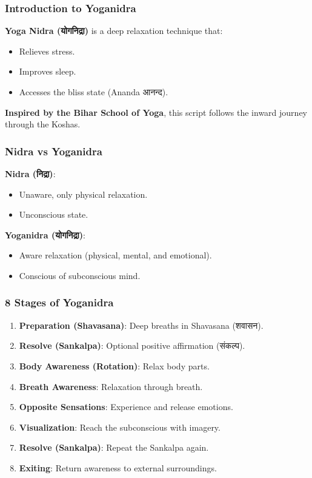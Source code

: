 \begin{frame}[fragile]\frametitle{Introduction to Yoganidra}
    \textbf{Yoga Nidra (योगनिद्रा)} is a deep relaxation technique that:
    \begin{itemize}
        \item Relieves stress.
        \item Improves sleep.
        \item Accesses the bliss state (Ananda आनन्द).
    \end{itemize}
    \textbf{Inspired by the Bihar School of Yoga}, this script follows the inward journey through the Koshas.
\end{frame}

\begin{frame}[fragile]\frametitle{Nidra vs Yoganidra}
    \textbf{Nidra (निद्रा)}: \\
    \begin{itemize}
        \item Unaware, only physical relaxation.
        \item Unconscious state.
    \end{itemize}
    \vspace{5mm}
    \textbf{Yoganidra (योगनिद्रा)}: \\
    \begin{itemize}
        \item Aware relaxation (physical, mental, and emotional).
        \item Conscious of subconscious mind.
    \end{itemize}
\end{frame}

\begin{frame}[fragile]\frametitle{8 Stages of Yoganidra}
    \begin{enumerate}
        \item \textbf{Preparation (Shavasana)}: Deep breaths in Shavasana (शवासन).
        \item \textbf{Resolve (Sankalpa)}: Optional positive affirmation (संकल्प).
        \item \textbf{Body Awareness (Rotation)}: Relax body parts.
        \item \textbf{Breath Awareness}: Relaxation through breath.
        \item \textbf{Opposite Sensations}: Experience and release emotions.
        \item \textbf{Visualization}: Reach the subconscious with imagery.
        \item \textbf{Resolve (Sankalpa)}: Repeat the Sankalpa again.
        \item \textbf{Exiting}: Return awareness to external surroundings.
    \end{enumerate}
\end{frame}

